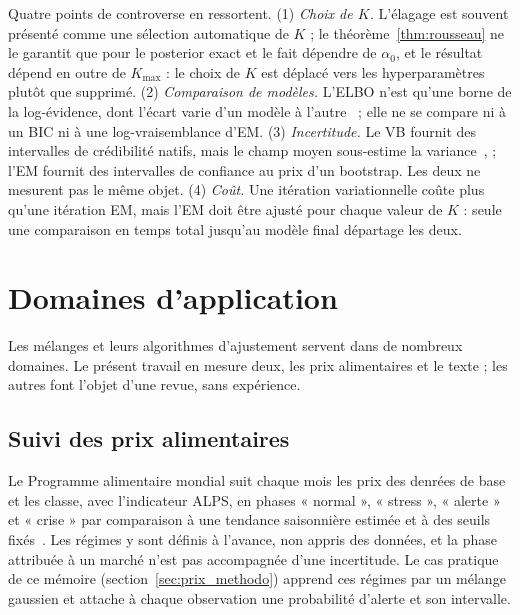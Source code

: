 Quatre points de controverse en ressortent. (1) \emph{Choix de $K$.} L'élagage est souvent présenté comme une sélection automatique de $K$ ; le théorème~\ref{thm:rousseau} ne le garantit que pour le posterior exact et le fait dépendre de $\alpha_0$, et le résultat dépend en outre de $K_{\max}$ : le choix de $K$ est déplacé vers les hyperparamètres plutôt que supprimé. (2) \emph{Comparaison de modèles.} L'ELBO n'est qu'une borne de la log-évidence, dont l'écart varie d'un modèle à l'autre~\cite{corduneanu2001} ; elle ne se compare ni à un BIC ni à une log-vraisemblance d'EM. (3) \emph{Incertitude.} Le VB fournit des intervalles de crédibilité natifs, mais le champ moyen sous-estime la variance~\cite[section~10.1.2]{bishop2006}, \cite{blei2017} ; l'EM fournit des intervalles de confiance au prix d'un bootstrap. Les deux ne mesurent pas le même objet. (4) \emph{Coût.} Une itération variationnelle coûte plus qu'une itération EM, mais l'EM doit être ajusté pour chaque valeur de $K$ : seule une comparaison en temps total jusqu'au modèle final départage les deux.

\section{Domaines d'application}\label{sec:portee}
Les mélanges et leurs algorithmes d'ajustement servent dans de nombreux domaines. Le présent travail en mesure deux, les prix alimentaires et le texte ; les autres font l'objet d'une revue, sans expérience.

\subsection{Suivi des prix alimentaires}\label{sec:ea_prix}
Le Programme alimentaire mondial suit chaque mois les prix des denrées de base et les classe, avec l'indicateur ALPS, en phases « normal », « stress », « alerte » et « crise » par comparaison à une tendance saisonnière estimée et à des seuils fixés~\cite{pam2014alps}. Les régimes y sont définis à l'avance, non appris des données, et la phase attribuée à un marché n'est pas accompagnée d'une incertitude. Le cas pratique de ce mémoire (section~\ref{sec:prix_methodo}) apprend ces régimes par un mélange gaussien et attache à chaque observation une probabilité d'alerte et son intervalle.


